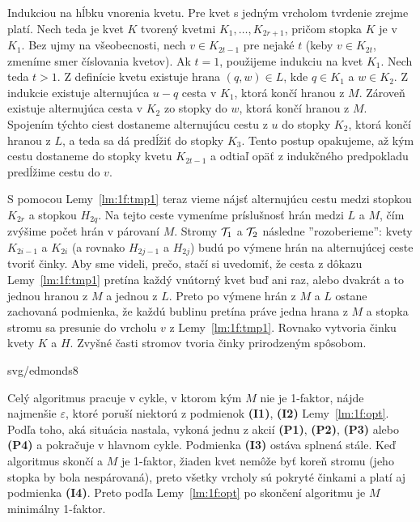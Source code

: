 \begin{dokaz}
  Indukciou na hĺbku vnorenia kvetu. Pre kvet s jedným vrcholom tvrdenie zrejme platí.
  Nech teda je kvet $K$ tvorený kvetmi $K_1,\ldots,K_{2r+1}$, pričom stopka $K$ je v $K_1$.
  Bez ujmy na všeobecnosti, nech $v\in K_{2t-1}$ pre nejaké $t$ (keby $v\in K_{2t}$, zmeníme
  smer číslovania kvetov). 
  Ak $t=1$, použijeme indukciu na kvet $K_1$. Nech teda $t>1$.
  Z definície kvetu existuje hrana $(q,w)\in L$, kde $q\in K_1$ a
  $w\in K_2$. Z indukcie existuje alternujúca $u-q$ cesta v $K_1$, ktorá končí hranou z $M$.
  Zároveň existuje alternujúca cesta v $K_2$ zo stopky do $w$, ktorá končí hranou z $M$.
  Spojením týchto ciest dostaneme alternujúcu cestu z $u$ do stopky $K_2$, ktorá končí hranou z $L$,
  a teda sa dá predĺžiť do stopky $K_3$. Tento postup opakujeme, až kým cestu dostaneme do 
  stopky kvetu $K_{2t-1}$ a odtiaľ opäť z indukčného predpokladu predĺžime cestu do $v$.
\end{dokaz}


\noindent
S pomocou Lemy~\ref{lm:1f:tmp1} teraz vieme nájsť alternujúcu cestu medzi stopkou $K_{2r}$ a stopkou $H_{2q}$.
Na tejto ceste vymeníme príslušnosť hrán medzi $L$ a $M$, čím zvýšime počet hrán v párovaní $M$.
Stromy ${\cal T}_1$ a ${\cal T}_2$ následne ''rozoberieme'': kvety $K_{2i-1}$ a $K_{2i}$ (a rovnako
$H_{2j-1}$ a $H_{2j}$) budú po výmene hrán na alternujúcej ceste tvoriť činky. Aby sme videli, prečo, 
stačí si uvedomiť, že
cesta z dôkazu Lemy~\ref{lm:1f:tmp1} pretína každý vnútorný kvet 
buď ani raz, alebo dvakrát a to jednou hranou z $M$ a jednou z $L$.
Preto  po výmene hrán z $M$ a $L$
ostane zachovaná podmienka, že každú bublinu pretína práve jedna hrana z $M$ a stopka stromu sa presunie 
do vrcholu $v$ z Lemy~\ref{lm:1f:tmp1}.
Rovnako vytvoria činku kvety $K$ a $H$.
Zvyšné časti stromov tvoria
činky prirodzeným spôsobom.

\begin{myfig}{\textwidth}{svg/edmonds8}
\end{myfig}


\noindent
Celý algoritmus pracuje v cykle, v ktorom kým $M$ nie je 1-faktor, nájde najmenšie $\varepsilon$,
ktoré poruší niektorú z podmienok {\bf(I1)},  {\bf(I2)} Lemy~\ref{lm:1f:opt}. Podľa toho, aká situácia
nastala, vykoná jednu z akcií {\bf(P1)},  {\bf(P2)}, {\bf(P3)} alebo {\bf(P4)} a pokračuje v hlavnom cykle.
Podmienka {\bf (I3)} ostáva splnená stále. Keď algoritmus skončí a $M$ je 1-faktor, žiaden kvet nemôže byť
koreň stromu (jeho stopka by bola nespárovaná), preto všetky vrcholy sú pokryté činkami a platí aj podmienka
{\bf (I4)}. Preto podľa Lemy~\ref{lm:1f:opt} po skončení algoritmu je $M$ minimálny 1-faktor.

